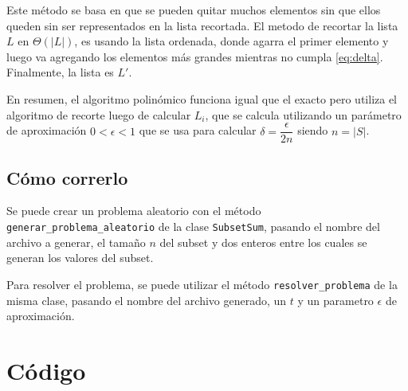 \documentclass[a4paper,10pt]{article}
\begin{document}
Este método se basa en que se pueden quitar muchos elementos sin que ellos queden sin ser representados en la lista recortada. El metodo de recortar la lista $L$ en $\Theta(|L|)$, es usando la lista ordenada, donde agarra el primer elemento y luego va agregando los elementos más grandes mientras no cumpla \ref{eq:delta}. Finalmente, la lista es $L'$.

En resumen, el algoritmo polinómico funciona igual que el exacto pero utiliza el algoritmo de recorte luego de calcular $L_i$, que se calcula utilizando un parámetro de aproximación $0 < \epsilon < 1$ que se usa para calcular $\delta = \dfrac{\epsilon} {2n}$ siendo $n=|S|$.

\subsection{Cómo correrlo}
Se puede crear un problema aleatorio con el método \texttt{generar\_problema\_aleatorio} de la clase \texttt{SubsetSum}, pasando el nombre del archivo a generar, el tamaño $n$ del subset y dos enteros entre los cuales se generan los valores del subset.

Para resolver el problema, se puede utilizar el método \texttt{resolver\_problema} de la misma clase, pasando el nombre del archivo generado, un $t$ y un parametro $\epsilon$ de aproximación.

\pagebreak

\newpage
\section{Código}
\lstset{
	language=Python, columns=flexible, breaklines=true, frame=single, title=creador\_grafos.py
}


\lstset{ title=grafo.py }


\lstset{ title=karger.py }


\lstset{ title=parser.py }


\lstset{ title=pg.py }


\lstset{ title=pg\_test.py }


\lstset{ title=subset\_sum.py }

\end{document}
